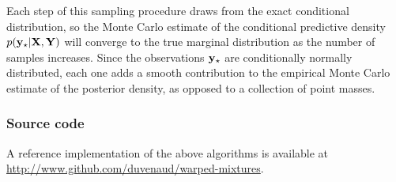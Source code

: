 Each step of this sampling procedure draws from the exact conditional distribution, so the Monte Carlo estimate of the conditional predictive density $p({\bf{y}}_\star | \mathbf{X}, \mathbf{Y})$ will converge to the true marginal distribution as the number of samples increases.
Since the observations ${\bf{y}}_\star$ are conditionally normally distributed, each one adds a smooth contribution to the empirical Monte Carlo estimate of the posterior density, as opposed to a collection of point masses.

\subsubsection{Source code}

A reference implementation of the above algorithms is available at\\ \url{http://www.github.com/duvenaud/warped-mixtures}.

\outbpdocument{


}

